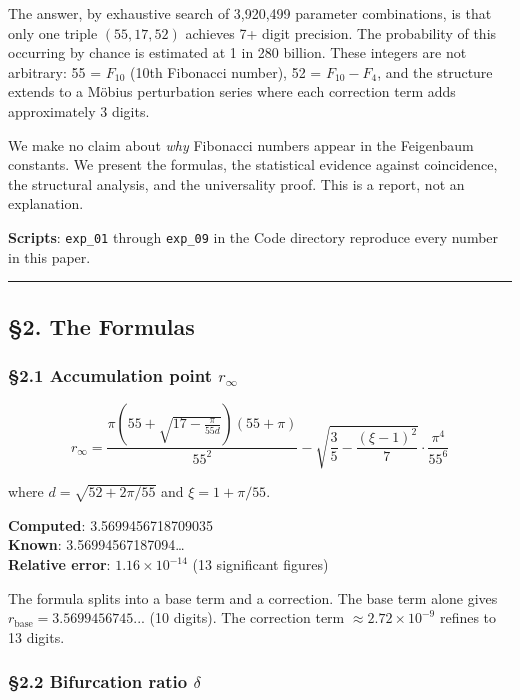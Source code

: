 \documentclass[
  11pt,
  a4paper]{article}
\begin{document}
The answer, by exhaustive search of 3,920,499 parameter combinations, is
that only one triple \((55, 17, 52)\) achieves 7+ digit precision. The
probability of this occurring by chance is estimated at 1 in 280
billion. These integers are not arbitrary: 55 = \(F_{10}\) (10th
Fibonacci number), 52 = \(F_{10} - F_4\), and the structure extends to a
Möbius perturbation series where each correction term adds approximately
3 digits.

We make no claim about \emph{why} Fibonacci numbers appear in the
Feigenbaum constants. We present the formulas, the statistical evidence
against coincidence, the structural analysis, and the universality
proof. This is a report, not an explanation.

\textbf{Scripts}: \texttt{exp\_01} through \texttt{exp\_09} in the Code
directory reproduce every number in this paper.

\begin{center}\rule{0.5\linewidth}{0.5pt}\end{center}

\subsection{§2. The Formulas}\label{the-formulas}

\subsubsection{\texorpdfstring{§2.1 Accumulation point
\(r_\infty\)}{§2.1 Accumulation point r\_\textbackslash infty}}\label{accumulation-point-r_infty}

\[r_\infty = \frac{\pi\left(55 + \sqrt{17 - \frac{\pi}{55d}}\right)(55 + \pi)}{55^2} - \sqrt{\frac{3}{5} - \frac{(\xi - 1)^2}{7}} \cdot \frac{\pi^4}{55^6}\]

where \(d = \sqrt{52 + 2\pi/55}\) and \(\xi = 1 + \pi/55\).

\textbf{Computed}: 3.5699456718709035\\
\textbf{Known}: 3.56994567187094\ldots{}\\
\textbf{Relative error}: \(1.16 \times 10^{-14}\) (13 significant
figures)

The formula splits into a base term and a correction. The base term
alone gives \(r_\text{base} = 3.5699456745...\) (10 digits). The
correction term \(\approx 2.72 \times 10^{-9}\) refines to 13 digits.

\subsubsection{\texorpdfstring{§2.2 Bifurcation ratio
\(\delta\)}{§2.2 Bifurcation ratio \textbackslash delta}}\label{bifurcation-ratio-delta}
\end{document}
